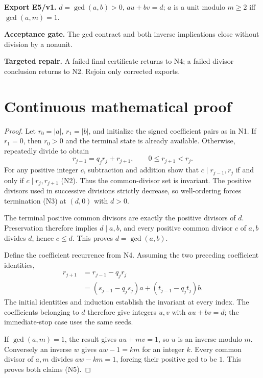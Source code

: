 \documentclass[preprint,12pt,aps,pra,showkeys,amsmath,amssymb,superscriptaddress,floatfix]{revtex4-2}
\theoremstyle{definition}
\theoremstyle{remark}
\newcommand{\field}[2]{\par\smallskip\noindent\textbf{#1.} #2\par}
\begin{document}
\field{Export E5/v1}{\(d=\gcd(a,b)>0\), \(au+bv=d\); \(a\) is a unit modulo \(m\ge2\) iff
\(\gcd(a,m)=1\).}

\field{Acceptance gate}{The gcd contract and both inverse implications close without division by
a nonunit.}

\field{Targeted repair}{A failed final certificate returns to N4; a failed divisor conclusion
returns to N2. Rejoin only corrected exports.}

\clearpage\section{Continuous mathematical proof}\label{sec:proof}

\begin{proof}

Let \(r_0=|a|\), \(r_1=|b|\), and initialize the signed coefficient
pairs as in N1. If \(r_1=0\), then \(r_0>0\) and the terminal state is
already available. Otherwise, repeatedly divide to obtain
\[r_{j-1}=q_jr_j+r_{j+1},\qquad 0\le r_{j+1}<r_j.\] For any positive
integer \(c\), subtraction and addition show that \(c\mid r_{j-1},r_j\)
if and only if \(c\mid r_j,r_{j+1}\) (N2). Thus the common-divisor set
is invariant. The positive divisors used in successive divisions
strictly decrease, so well-ordering forces termination (N3) at \((d,0)\)
with \(d>0\).

The terminal positive common divisors are exactly the positive divisors
of \(d\). Preservation therefore implies \(d\mid a,b\), and every
positive common divisor \(c\) of \(a,b\) divides \(d\), hence
\(c\le d\). This proves \(d=\gcd(a,b)\).

Define the coefficient recurrence from N4. Assuming the two preceding
coefficient identities,
\[\begin{aligned}r_{j+1}&=r_{j-1}-q_jr_j\\&=(s_{j-1}-q_js_j)a+(t_{j-1}-q_jt_j)b.\end{aligned}\]
The initial identities and induction establish the invariant at every
index. The coefficients belonging to \(d\) therefore give integers
\(u,v\) with \(au+bv=d\); the immediate-stop case uses the same seeds.

If \(\gcd(a,m)=1\), the result gives \(au+mv=1\), so \(u\) is an inverse
modulo \(m\). Conversely an inverse \(w\) gives \(aw-1=km\) for an
integer \(k\). Every common divisor of \(a,m\) divides \(aw-km=1\),
forcing their positive gcd to be \(1\). This proves both claims (N5).

\end{proof}
\end{document}
